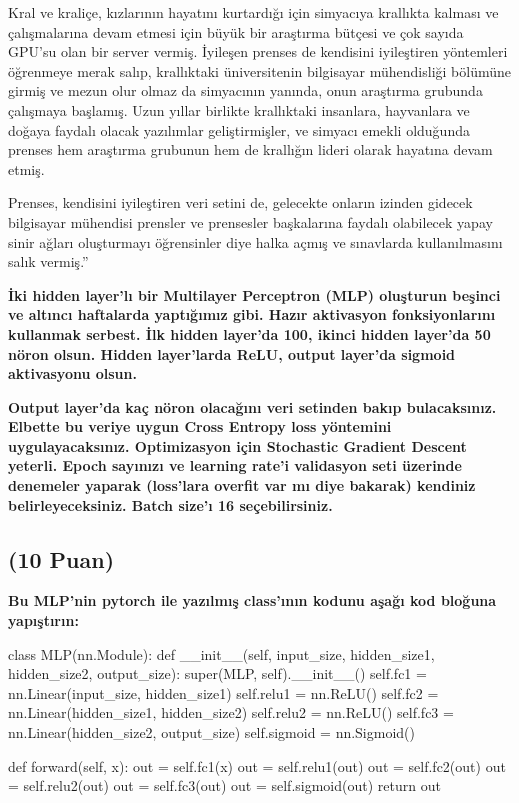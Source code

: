 \documentclass[11pt]{article}
\begin{document}
Kral ve kraliçe, kızlarının hayatını kurtardığı için simyacıya krallıkta kalması ve çalışmalarına devam etmesi için büyük bir araştırma bütçesi ve çok sayıda GPU'su olan bir server vermiş. İyileşen prenses de kendisini iyileştiren yöntemleri öğrenmeye merak salıp, krallıktaki üniversitenin bilgisayar mühendisliği bölümüne girmiş ve mezun olur olmaz da simyacının yanında, onun araştırma grubunda çalışmaya başlamış. Uzun yıllar birlikte krallıktaki insanlara, hayvanlara ve doğaya faydalı olacak yazılımlar geliştirmişler, ve simyacı emekli olduğunda prenses hem araştırma grubunun hem de krallığın lideri olarak hayatına devam etmiş.

Prenses, kendisini iyileştiren veri setini de, gelecekte onların izinden gidecek bilgisayar mühendisi prensler ve prensesler başkalarına faydalı olabilecek yapay sinir ağları oluşturmayı öğrensinler diye halka açmış ve sınavlarda kullanılmasını salık vermiş.''

\textbf{İki hidden layer'lı bir Multilayer Perceptron (MLP) oluşturun beşinci ve altıncı haftalarda yaptığımız gibi. Hazır aktivasyon fonksiyonlarını kullanmak serbest. İlk hidden layer'da 100, ikinci hidden layer'da 50 nöron olsun. Hidden layer'larda ReLU, output layer'da sigmoid aktivasyonu olsun.}

\textbf{Output layer'da kaç nöron olacağını veri setinden bakıp bulacaksınız. Elbette bu veriye uygun Cross Entropy loss yöntemini uygulayacaksınız. Optimizasyon için Stochastic Gradient Descent yeterli. Epoch sayınızı ve learning rate'i validasyon seti üzerinde denemeler yaparak (loss'lara overfit var mı diye bakarak) kendiniz belirleyeceksiniz. Batch size'ı 16 seçebilirsiniz.}

\subsection{(10 Puan)} \textbf{Bu MLP'nin pytorch ile yazılmış class'ının kodunu aşağı kod bloğuna yapıştırın:}

\begin{python}
class MLP(nn.Module):
    def __init__(self, input_size, hidden_size1, hidden_size2, output_size):
        super(MLP, self).__init__()
        self.fc1 = nn.Linear(input_size, hidden_size1)
        self.relu1 = nn.ReLU()
        self.fc2 = nn.Linear(hidden_size1, hidden_size2)
        self.relu2 = nn.ReLU()
        self.fc3 = nn.Linear(hidden_size2, output_size)
        self.sigmoid = nn.Sigmoid()

    def forward(self, x):
        out = self.fc1(x)
        out = self.relu1(out)
        out = self.fc2(out)
        out = self.relu2(out)
        out = self.fc3(out)
        out = self.sigmoid(out)
        return out
\end{python}
\end{document}
